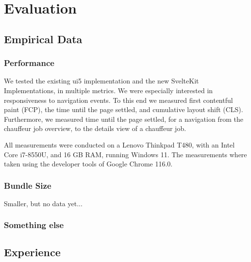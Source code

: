 \chapter{Evaluation}
\label{ch:evaluation}

\section{Empirical Data}

\subsection{Performance}

We tested the existing ui5 implementation and the new SvelteKit Implementations, in multiple metrics. We were especially interested in responsiveness to navigation events. To this end we measured first contentful paint (FCP), the time until the page settled, and cumulative layout shift (CLS). Furthermore, we measured time until the page settled, for a navigation from the chauffeur job overview, to the details view of a chauffeur job.

All measurements were conducted on a Lenovo Thinkpad T480, with an Intel Core i7-8550U, and 16 GB RAM, running Windows 11. The measurements where taken using the developer tools of Google Chrome 116.0.

\subsection{Bundle Size}

Smaller, but no data yet...

\subsection{Something else}


\section{Experience}

